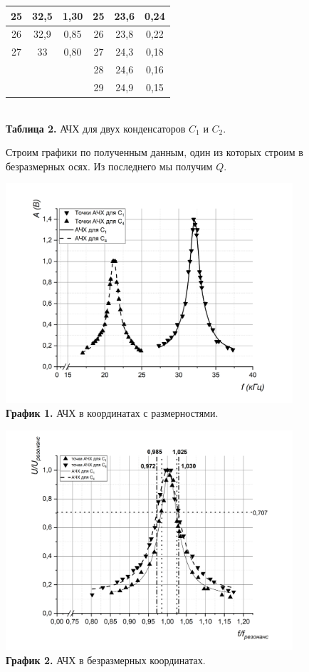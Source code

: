 \documentclass[a4paper, 12pt]{article}%
\begin{document}
\begin{center}
\begin{tabular}{ccc|c|c|c|}
\multicolumn{1}{|c|}{25}  & \multicolumn{1}{c|}{32,5}      & \multicolumn{1}{c|}{1,30}    & 25  & 23,6   & 0,24 \\ \hline
\multicolumn{1}{|c|}{26}  & \multicolumn{1}{c|}{32,9}  & \multicolumn{1}{c|}{0,85}  & 26  & 23,8  & 0,22 \\ \hline
\multicolumn{1}{|c|}{27}  & \multicolumn{1}{c|}{33}        & \multicolumn{1}{c|}{0,80}  & 27  & 24,3  & 0,18  \\ \hline
 \multicolumn{1}{l}{}                 & \multicolumn{1}{l}{}        & \multicolumn{1}{l|}{} & 28  & 24,6           & 0,16         \\ \cline{4-6} 
\multicolumn{1}{l}{}           & \multicolumn{1}{l}{}        & \multicolumn{1}{l|}{} & 29  & 24,9      & 0,15  \\ \cline{4-6} 
\end{tabular}\\
\textbf{Таблица 2.} АЧХ для двух конденсаторов $C_1$ и $C_2$.
\end{center}
\newpage
Строим графики по полученным данным, один из которых строим в безразмерных осях. Из последнего мы получим $Q$.\\
\begin{center}
\includegraphics[width = 0.8\textwidth]{2.jpg}\\
\textbf{График 1.} АЧХ в координатах с размерностями.
\end{center}
\begin{center}
\includegraphics[width = 0.8\textwidth]{3.jpg}\\
\textbf{График 2.} АЧХ в безразмерных координатах.
\end{center}
\end{document}
